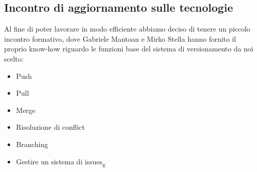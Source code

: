 \subsection{Incontro di aggiornamento sulle tecnologie}
Al fine di poter lavorare in modo efficiente abbiamo deciso di tenere un piccolo incontro formativo, dove Gabriele Mantoan e Mirko Stella hanno fornito il proprio know-how riguardo le funzioni base del sistema di versionamento da noi scelto:
\begin{itemize}
	\item Push
	\item Pull
	\item Merge
	\item Risoluzione di conflict
	\item Branching
	\item Gestire un sistema di issues\textsubscript{g}
\end{itemize}